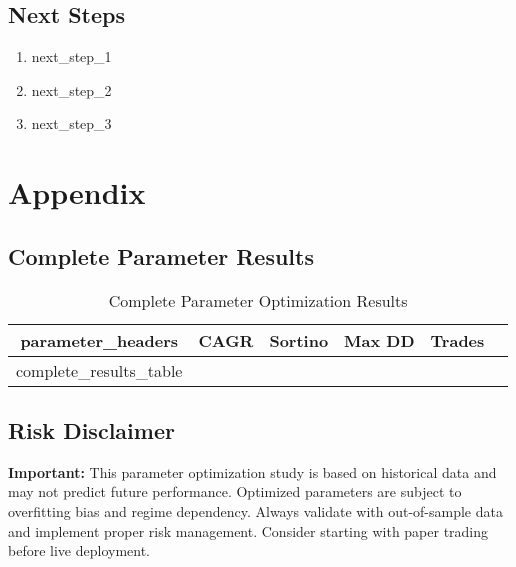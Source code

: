 \documentclass[11pt,a4paper]{article}
\begin{document}
\subsection{Next Steps}
\begin{enumerate}
\item {{next_step_1}}
\item {{next_step_2}}
\item {{next_step_3}}
\end{enumerate}

\section{Appendix}

\subsection{Complete Parameter Results}
\begin{longtable}{cccccc}
\toprule
{{parameter_headers}} & \textbf{CAGR} & \textbf{Sortino} & \textbf{Max DD} & \textbf{Trades} \\
\midrule
{{complete_results_table}}
\bottomrule
\caption{Complete Parameter Optimization Results}
\end{longtable}

\subsection{Risk Disclaimer}
\textcolor{loss}{\textbf{Important:}} This parameter optimization study is based on historical data and may not predict future performance. Optimized parameters are subject to overfitting bias and regime dependency. Always validate with out-of-sample data and implement proper risk management. Consider starting with paper trading before live deployment.
\end{document}
